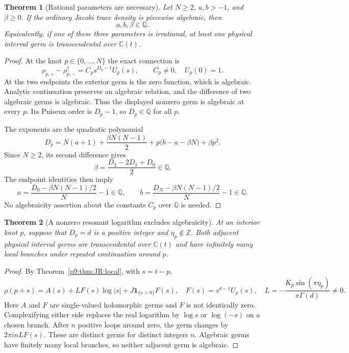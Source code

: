 \documentclass[11pt,a4paper]{article}
\newtheorem{theorem}{Theorem}[section]
\theoremstyle{definition}
\theoremstyle{remark}
\newcommand{\Q}{\mathbb Q}
\newcommand{\C}{\mathbb C}
\newcommand{\Z}{\mathbb Z}
\numberwithin{equation}{section}
\begin{document}
\begin{theorem}[Rational parameters are necessary]
\label{p9:alg:rational-necessary}
Let $N\ge2$, $a,b>-1$, and $\beta\ge0$. If the ordinary Jacobi trace
density is piecewise algebraic, then
\[
                         a,b,\beta\in\Q.
\]
Equivalently, if one of these three parameters is irrational, at least
one physical interval germ is transcendental over $\C(t)$.
\end{theorem}
\begin{proof}
At the knot $p\in\{0,\ldots,N\}$ the exact connection is
\[
 \rho_{p,+}-\rho_{p,-}^{\uparrow}
       =C_p s^{D_p-1}U_p(s),\qquad C_p\ne0,\quad U_p(0)=1.
\]
At the two endpoints the exterior germ is the zero function, which is
algebraic. Analytic continuation preserves an algebraic relation, and
the difference of two algebraic germs is algebraic. Thus the displayed
nonzero germ is algebraic at every $p$. Its Puiseux order is $D_p-1$,
so $D_p\in\Q$ for all $p$.

The exponents are the quadratic polynomial
\[
 D_p=N(a+1)+\frac{\beta N(N-1)}2
                 +p\bigl(b-a-\beta N\bigr)+\beta p^2.
\]
Since $N\ge2$, its second difference gives
\[
 \beta=\frac{D_2-2D_1+D_0}{2}\in\Q.
\]
The endpoint identities then imply
\[
 a=\frac{D_0-\beta N(N-1)/2}{N}-1\in\Q,
 \qquad
 b=\frac{D_N-\beta N(N-1)/2}{N}-1\in\Q.
\]
No algebraicity assertion about the constants $C_p$ over $\Q$ is needed.
\end{proof}

\begin{theorem}[A nonzero resonant logarithm excludes algebraicity]
\label{p9:alg:log-obstruction}
At an interior knot $p$, suppose that $D_p=d$ is a positive integer
and $\eta_p\notin\Z$. Both adjacent physical interval germs are
transcendental over $\C(t)$ and have infinitely many local branches
under repeated continuation around $p$.
\end{theorem}
\begin{proof}
By Theorem~\ref{p9:thm:JR:local}, with $s=t-p$,
\[
 \rho(p+s)=A(s)+L F(s)\log|s|
                    +J\mathbf1_{\{s>0\}}F(s),
 \quad
 F(s)=s^{d-1}U_p(s),\quad
 L=-\frac{K_p\sin(\pi\eta_p)}{\pi\Gamma(d)}\ne0.
\]
Here $A$ and $F$ are single-valued holomorphic germs and $F$ is not
identically zero. Complexifying either side replaces the real logarithm
by $\log s$ or $\log(-s)$ on a chosen branch. After $n$ positive loops
around zero, the germ changes by $2\pi i nL F(s)$. These are distinct
germs for distinct integers $n$. Algebraic germs have finitely many
local branches, so neither adjacent germ is algebraic.
\end{proof}
\end{document}
